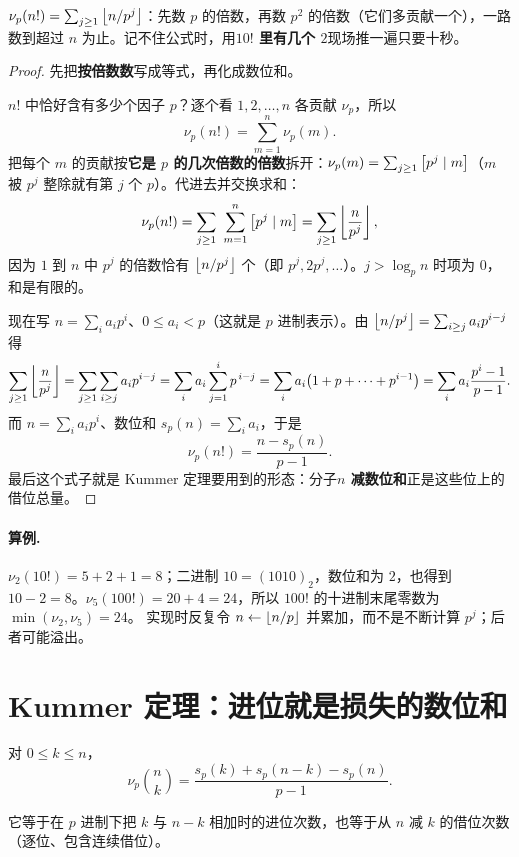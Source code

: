 \begin{tip}[一句话版]
$\nu_p(n!)=\sum_{j\ge1}\left\lfloor n/p^j\right\rfloor$：先数 $p$ 的倍数，再数 $p^2$ 的倍数（它们多贡献一个），一路数到超过 $n$ 为止。记不住公式时，用\textbf{$10!$ 里有几个 $2$}现场推一遍只要十秒。
\end{tip}

\begin{proof}
先把\textbf{按倍数数}写成等式，再化成数位和。

$n!$ 中恰好含有多少个因子 $p$？逐个看 $1,2,\ldots,n$ 各贡献 $\nu_p$，所以
\[
 \nu_p(n!)=\sum_{m=1}^{n}\nu_p(m).
\]
把每个 $m$ 的贡献按\textbf{它是 $p$ 的几次倍数的倍数}拆开：$\nu_p(m)=\sum_{j\ge1}\left[p^j\mid m\right]$（$m$ 被 $p^j$ 整除就有第 $j$ 个 $p$）。代进去并交换求和：
\[
 \nu_p(n!)=\sum_{j\ge1}\ \sum_{m=1}^{n}\iva{p^j\mid m}=\sum_{j\ge1}\floor{\frac{n}{p^j}},
\]
因为 $1$ 到 $n$ 中 $p^j$ 的倍数恰有 $\left\lfloor n/p^j\right\rfloor$ 个（即 $p^j,2p^j,\ldots$）。$j>\log_p n$ 时项为 $0$，和是有限的。

现在写 $n=\sum_i a_ip^i$、$0\le a_i<p$（这就是 $p$ 进制表示）。由 $\left\lfloor n/p^j\right\rfloor=\sum_{i\ge j}a_ip^{i-j}$ 得
\[
 \sum_{j\ge1}\left\lfloor \frac{n}{p^j}\right\rfloor
 =\sum_{j\ge1}\sum_{i\ge j}a_ip^{i-j}
 =\sum_{i}a_i\sum_{j=1}^{i}p^{\,i-j}
 =\sum_i a_i\big(1+p+\cdots+p^{i-1}\big)
 =\sum_i a_i\frac{p^i-1}{p-1}.
\]
而 $n=\sum_i a_ip^i$、数位和 $s_p(n)=\sum_i a_i$，于是
\[
 \nu_p(n!)=\frac{n-s_p(n)}{p-1}.
\]
最后这个式子就是 Kummer 定理要用到的形态：分子\textbf{$n$ 减数位和}正是这些位上的借位总量。
\end{proof}

\paragraph{算例.} $\nu_2(10!)=5+2+1=8$；二进制 $10=(1010)_2$，数位和为 $2$，也得到 $10-2=8$。$\nu_5(100!)=20+4=24$，所以 $100!$ 的十进制末尾零数为 $\min(\nu_2,\nu_5)=24$。
实现时反复令 $n\gets\left\lfloor n/p\right\rfloor$ 并累加，而不是不断计算 $p^j$；后者可能溢出。


\section{Kummer 定理：进位就是损失的数位和}
\begin{theorem}
对 $0\le k\le n$，
\[
\nu_p\binom nk=\frac{s_p(k)+s_p(n-k)-s_p(n)}{p-1}.
\]


它等于在 $p$ 进制下把 $k$ 与 $n-k$ 相加时的进位次数，也等于从 $n$ 减 $k$ 的借位次数（逐位、包含连续借位）。
\end{theorem}

